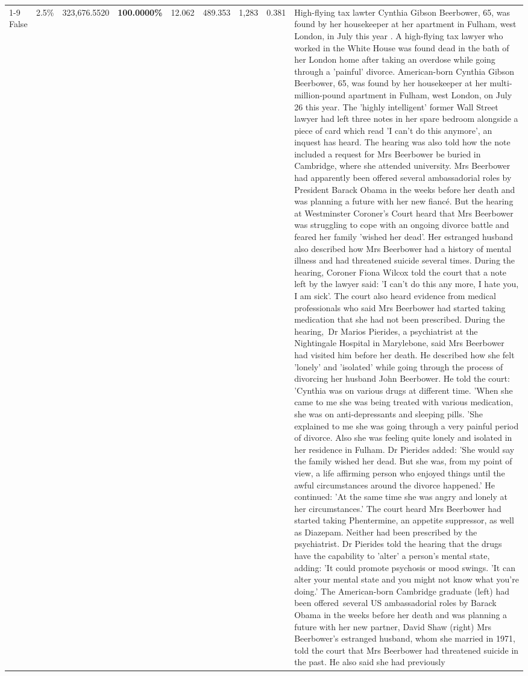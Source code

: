 \begin{table}[H]
\begin{tabular}{lllrlllll}
\cline{1-9}
False & 2.5\% & 323,676.5520 & \bfseries \color{red} 100.0000\% & 12.062 & 489.353 & 1,283 & 0.381 & High-flying tax lawter Cynthia Gibson Beerbower, 65, was found by her housekeeper at her apartment in Fulham, west London, in July this year . A high-flying tax lawyer who worked in the White House was found dead in the bath of her London home after taking an overdose while going through a 'painful' divorce. American-born Cynthia Gibson Beerbower, 65, was found by her housekeeper at her multi-million-pound apartment in Fulham, west London, on July 26 this year. The 'highly intelligent' former Wall Street lawyer had left three notes in her spare bedroom alongside a piece of card which read 'I can't do this anymore', an inquest has heard. The hearing was also told how the note included a request for Mrs Beerbower be buried in Cambridge, where she attended university. Mrs Beerbower had apparently been offered several ambassadorial roles by President Barack Obama in the weeks before her death and was planning a future with her new fiancé. But the hearing at Westminster Coroner's Court heard that Mrs Beerbower was struggling to cope with an ongoing divorce battle and feared her family 'wished her dead'. Her estranged husband also described how Mrs Beerbower had a history of mental illness and had threatened suicide several times. During the hearing, Coroner Fiona Wilcox told the court that a note left by the lawyer said: 'I can't do this any more, I hate you, I am sick'. The court also heard evidence from medical professionals who said Mrs Beerbower had started taking medication that she had not been prescribed. During the hearing, Dr Marios Pierides, a psychiatrist at the Nightingale Hospital in Marylebone, said Mrs Beerbower had visited him before her death. He described how she felt 'lonely' and 'isolated' while going through the process of divorcing her husband John Beerbower. He told the court: 'Cynthia was on various drugs at different time. 'When she came to me she was being treated with various medication, she was on anti-depressants and sleeping pills. 'She explained to me she was going through a very painful period of divorce. Also she was feeling quite lonely and isolated in her residence in Fulham. Dr Pierides added: 'She would say the family wished her dead. But she was, from my point of view, a life affirming person who enjoyed things until the awful circumstances around the divorce happened.' He continued: 'At the same time she was angry and lonely at her circumstances.' The court heard Mrs Beerbower had started taking Phentermine, an appetite suppressor, as well as Diazepam. Neither had been prescribed by the psychiatrist. Dr Pierides told the hearing that the drugs have the capability to 'alter' a person's mental state, adding: 'It could promote psychosis or mood swings. 'It can alter your mental state and you might not know what you're doing.' The American-born Cambridge graduate (left) had been offered several US ambassadorial roles by Barack Obama in the weeks before her death and was planning a future with her new partner, David Shaw (right) Mrs Beerbower's estranged husband, whom she married in 1971, told the court that Mrs Beerbower had threatened suicide in the past. He also said she had previously 
\end{tabular}
\end{table}
